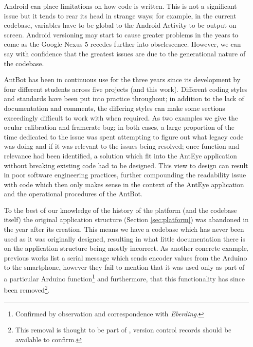 \documentclass[a4paper,11pt,twoside,openright]{article}
\begin{document}
Android can place limitations on how code is written. This is not a
significant issue but it tends to rear its head in strange ways; for
example, in the current codebase, variables have to be global to the
Android Activity to be output on screen. Android versioning may start
to cause greater problems in the years to come as the Google Nexus 5
recedes further into obselescence. However, we can say with confidence
that the greatest issues are due to the generational nature of the
codebase.
\newline\par

AntBot has been in continuous use for the three years since its
development by four different students across five projects
\cite{Eberding2016,Scimeca2017,Zhang2017,Mitchell2018} (and this
work). Different coding styles and standards have been put into
practice throughout; in addition to the lack of documentation and
comments, the differing styles can make some sections exceedingly
difficult to work with when required. As two examples we give the
ocular calibration and framerate bug; in both cases, a large
proportion of the time dedicated to the issue was spent attempting to
figure out what legacy code was doing and if it was relevant to the
issues being resolved; once function and relevance had been
identified, a solution which fit into the AntEye application without
breaking existing code had to be designed. This view to design can
result in poor software engineering practices, further compounding the
readability issue with code which then only makes sense in the context
of the AntEye application and the operational procedures of the
AntBot.
\newline\par

To the best of our knowledge of the history of the platform (and the
codebase itself) the original application structure (Section
\ref{sec:platform}) was abandoned in the year after its creation.
This means we have a codebase which has never been used as it was
originally designed, resulting in what little documentation there is
on the application structure being mostly incorrect. As another
concrete example, previous works \cite{Eberding2016, Scimeca2017,
  Zhang2017} list a serial message which sends encoder values from the
Arduino to the smartphone, however they fail to mention that it was
used only as part of a particular Arduino function\footnote{Confirmed
  by observation and correspondence with \textit{Eberding}.} and furthermore,
that this functionality has since been removed\footnote{This removal is
thought to be part of \cite{Scimeca2017}, version control records
should be available to confirm.}.
\newline\par
\end{document}
